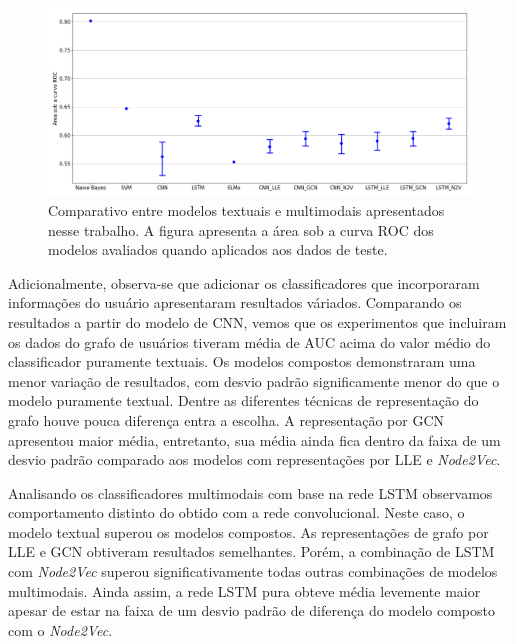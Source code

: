 \begin{figure}[h]
\begin{center} {
    \begin{center}
    \includegraphics[scale=0.35]{images/experiment_results.png}
    \caption{Comparativo entre modelos textuais e multimodais apresentados nesse
             trabalho. A figura apresenta a área sob a curva ROC dos modelos
             avaliados quando aplicados aos dados de teste.}
    \label{fig:experiment_results}
    \end{center}
}
\end{center}
\end{figure}

Adicionalmente, observa-se que adicionar os classificadores que incorporaram
informações do usuário apresentaram resultados váriados.
Comparando os resultados a partir do modelo de CNN, vemos que os experimentos
que incluiram os dados do grafo de usuários tiveram média de AUC
acima do valor médio do classificador puramente textuais.
Os modelos compostos demonstraram uma menor variação de resultados, com desvio
padrão significamente menor do que o modelo puramente textual.
Dentre as diferentes técnicas de representação do grafo houve pouca diferença
entra a escolha.
A representação por GCN apresentou maior média, entretanto, sua média ainda fica
dentro da faixa de um desvio padrão comparado aos modelos com representações por
LLE e \textit{Node2Vec}.

Analisando os classificadores multimodais com base na rede LSTM observamos
comportamento distinto do obtido com a rede convolucional.
Neste caso, o modelo textual superou os modelos compostos.
As representações de grafo por LLE e GCN obtiveram resultados semelhantes.
Porém, a combinação de LSTM com \textit{Node2Vec} superou significativamente
todas outras combinações de modelos multimodais.
Ainda assim, a rede LSTM pura obteve média levemente maior apesar de estar na
faixa de um desvio padrão de diferença do modelo composto com o
\textit{Node2Vec}.

